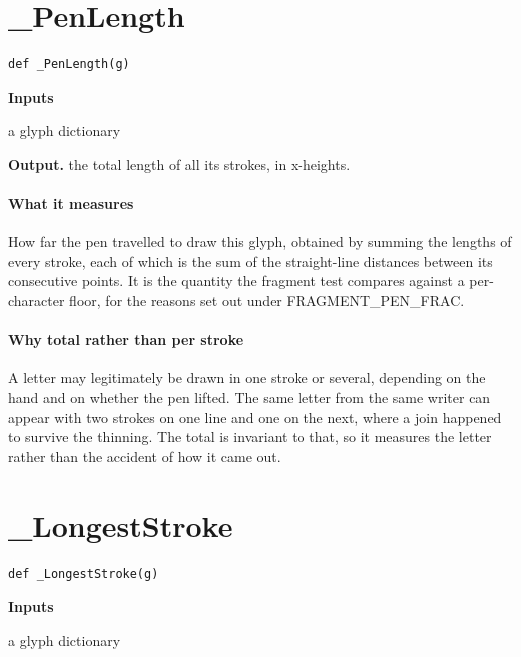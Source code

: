 \section{\_PenLength}
\begin{lstlisting}[style=sig]
def _PenLength(g)
\end{lstlisting}

\noindent\textbf{Inputs}
\begin{description}[leftmargin=2.2em,style=nextline,font=\normalfont\ttfamily]\setlength\itemsep{1pt}
  \item[{g}] \normalfont a glyph dictionary
\end{description}

\noindent\textbf{Output.} the total length of all its strokes, in x-heights.


\paragraph{What it measures}
How far the pen travelled to draw this glyph, obtained by summing the lengths of every stroke, each of which is the sum of the straight-line distances between its consecutive points. It is the quantity the fragment test compares against a per-character floor, for the reasons set out under FRAGMENT\_PEN\_FRAC.


\paragraph{Why total rather than per stroke}
A letter may legitimately be drawn in one stroke or several, depending on the hand and on whether the pen lifted. The same letter from the same writer can appear with two strokes on one line and one on the next, where a join happened to survive the thinning. The total is invariant to that, so it measures the letter rather than the accident of how it came out.


\section{\_LongestStroke}
\begin{lstlisting}[style=sig]
def _LongestStroke(g)
\end{lstlisting}

\noindent\textbf{Inputs}
\begin{description}[leftmargin=2.2em,style=nextline,font=\normalfont\ttfamily]\setlength\itemsep{1pt}
  \item[{g}] \normalfont a glyph dictionary
\end{description}

